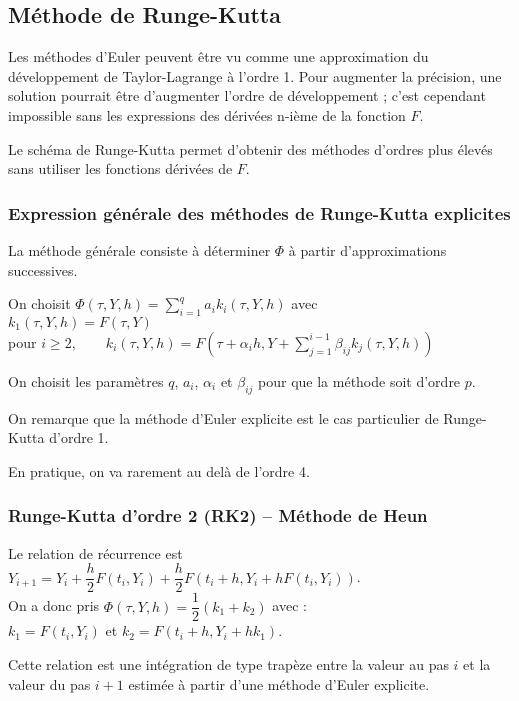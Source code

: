 \documentclass[10pt]{article}
\begin{document}
\subsection{Méthode de Runge-Kutta}
Les méthodes d'Euler peuvent être vu comme une approximation du développement de Taylor-Lagrange à l'ordre 1. Pour augmenter la précision, une solution pourrait être d'augmenter l'ordre de développement ; c'est cependant impossible sans les expressions des dérivées n-ième de la fonction $  {F}$.

Le schéma de Runge-Kutta permet d'obtenir des méthodes d'ordres plus élevés sans utiliser les fonctions dérivées de $  {F}$.

\subsubsection{Expression générale des méthodes de Runge-Kutta explicites}

La méthode générale consiste à déterminer $  {\Phi}$ à partir d'approximations successives.

On choisit $\displaystyle   {\Phi}(\tau,  {Y},h) = \sum_{i=1}^q a_i k_i(\tau,  {Y},h)$ avec\\
$k_1(\tau,  {Y},h) =   {F}(\tau,  {Y})$\\
pour $i\geq 2,\qquad k_i(\tau,  {Y},h) =   {F}(\tau+\alpha_ih,   {Y}+\sum_{j=1}^{i-1} \beta_{ij} k_j(\tau,  {Y},h))$

On choisit les paramètres $q$, $a_i$, $\alpha_i$ et $\beta_{ij}$ pour que la méthode soit d'ordre $p$.

\medskip
On remarque que la méthode d'Euler explicite est le cas particulier de Runge-Kutta d'ordre 1.

En pratique, on va rarement au delà de l'ordre 4.

\subsubsection{Runge-Kutta d'ordre 2 (RK2) -- Méthode de Heun}
Le relation de récurrence est $  {Y}_{i+1} =   {Y}_{i} + \dfrac{h}{2}  {F}(t_{i},  {Y}_{i})+ \dfrac{h}{2}  {F}(t_{i}+h,  {Y}_{i}+h  {F}(t_{i},  {Y}_{i}))$.\\
On a donc pris $  {\Phi}(\tau,  {Y},h) = \dfrac{1}{2}(k_1+k_2)$ avec :\\
$k_1=   {F}(t_{i},  {Y}_{i})$ et $k_2=  {F}(t_{i}+h,  {Y}_{i}+h k_1)$.

Cette relation est une intégration de type trapèze entre la valeur au pas $i$ et la valeur du pas $i+1$ estimée à partir d'une méthode d'Euler explicite. 
\end{document}
